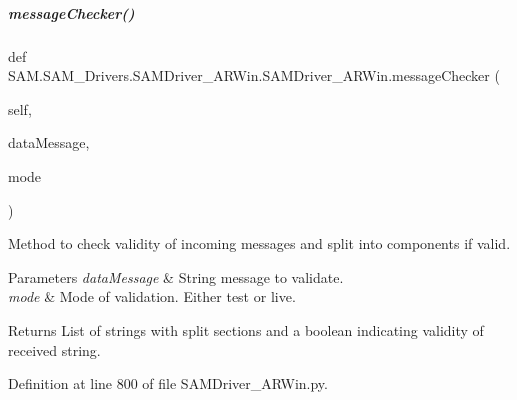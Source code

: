 \mbox{\label{group__icubclient__SAM__Drivers_a3efad08324380997a894dd960a302bc2}} 
\subparagraph{\texorpdfstring{message\+Checker()}{messageChecker()}}
{\footnotesize\ttfamily def S\+A\+M.\+S\+A\+M\+\_\+\+Drivers.\+S\+A\+M\+Driver\+\_\+\+A\+R\+Win.\+S\+A\+M\+Driver\+\_\+\+A\+R\+Win.\+message\+Checker (\begin{DoxyParamCaption}\item[{}]{self,  }\item[{}]{data\+Message,  }\item[{}]{mode }\end{DoxyParamCaption})}



Method to check validity of incoming messages and split into components if valid. 


\begin{DoxyParams}{Parameters}
{\em data\+Message} & String message to validate. \\
\hline
{\em mode} & Mode of validation. Either {\ttfamily \textquotesingle{}test\textquotesingle{}} or {\ttfamily \textquotesingle{}live\textquotesingle{}}.\\
\hline
\end{DoxyParams}
\begin{DoxyReturn}{Returns}
List of strings with split sections and a boolean indicating validity of received string. 
\end{DoxyReturn}


Definition at line 800 of file S\+A\+M\+Driver\+\_\+\+A\+R\+Win.\+py.

